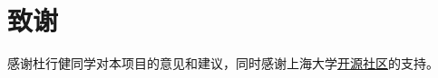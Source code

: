 \documentclass[UTF8]{ctexart}
\numberwithin{equation}{section} %
\numberwithin{table}{section} %
\begin{document}
\pagebreak
\section*{致谢}
感谢杜行健同学对本项目的意见和建议，同时感谢上海大学\href{https://www.shuosc.org/}{开源社区}的支持。
\end{document}

